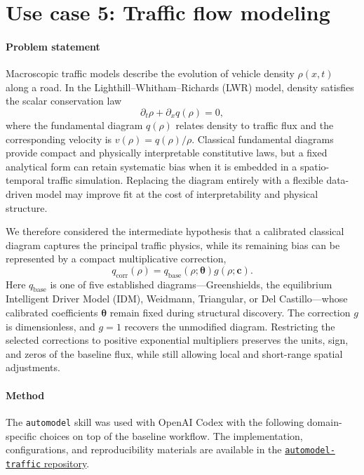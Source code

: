 \section{Use case 5: Traffic flow modeling}
\label{sec:traffic-flow}

\paragraph{Problem statement}
Macroscopic traffic models describe the evolution of vehicle density
$\rho(x,t)$ along a road. In the Lighthill--Whitham--Richards (LWR) model,
density satisfies the scalar conservation law
\begin{equation}
    \partial_t \rho + \partial_x q(\rho) = 0,
    \label{eq:traffic-lwr}
\end{equation}
where the fundamental diagram $q(\rho)$ relates density to traffic flux and
the corresponding velocity is $v(\rho)=q(\rho)/\rho$. Classical fundamental
diagrams provide compact and physically interpretable constitutive laws, but a
fixed analytical form can retain systematic bias when it is embedded in a
spatio-temporal traffic simulation. Replacing the diagram entirely with a
flexible data-driven model may improve fit at the cost of interpretability and
physical structure.

We therefore considered the intermediate hypothesis that a calibrated
classical diagram captures the principal traffic physics, while its remaining
bias can be represented by a compact multiplicative correction,
\begin{equation}
    q_{\mathrm{corr}}(\rho)
    = q_{\mathrm{base}}(\rho;\boldsymbol{\theta})
      g(\rho;\boldsymbol{c}).
    \label{eq:traffic-correction}
\end{equation}
Here $q_{\mathrm{base}}$ is one of five established diagrams---Greenshields,
the equilibrium Intelligent Driver Model (IDM), Weidmann, Triangular, or Del
Castillo---whose calibrated coefficients $\boldsymbol{\theta}$ remain fixed
during structural discovery. The correction $g$ is dimensionless, and
$g=1$ recovers the unmodified diagram. Restricting the selected corrections to
positive exponential multipliers preserves the units, sign, and zeros of the
baseline flux, while still allowing local and short-range spatial adjustments.

\paragraph{Method}
The \texttt{automodel} skill was used with OpenAI Codex with the following
domain-specific choices on top of the baseline workflow. The implementation,
configurations, and reproducibility materials are available in the
\href{https://github.com/cpml-au/automodel-traffic}{\texttt{automodel-traffic}
repository}.

